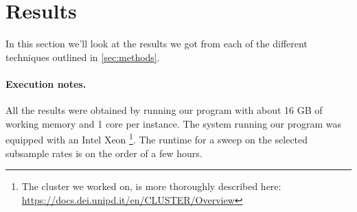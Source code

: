 \section{Results}
\label{sec:results}
In this section we'll look at the results we got from each of the different techniques outlined in \autoref{sec:methods}.

\paragraph{Execution notes.}
All the results were obtained by running our program with about 16 GB of working memory and 1 core per instance. The system running our program was equipped with an Intel Xeon \footnote{The cluster we worked on, is more thoroughly described here: \url{https://docs.dei.unipd.it/en/CLUSTER/Overview}}. The runtime for a sweep on the selected subsample rates is on the order of a few hours.



